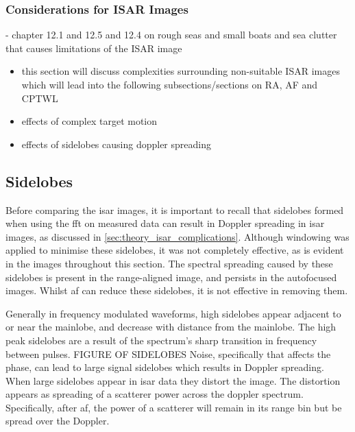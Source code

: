 \documentclass[class=report,11pt,crop=false]{standalone}
\begin{document}
    \subsubsection{Considerations for ISAR Images}
    - chapter 12.1 and 12.5 and 12.4 on rough seas and small boats and sea clutter that causes limitations of the ISAR image
    \begin{itemize}
        \item this section will discuss complexities surrounding non-suitable ISAR images which will lead into the following subsections/sections on RA, AF and CPTWL
        \item effects of complex target motion
        \item effects of sidelobes causing doppler spreading
    \end{itemize}

    \subsection{Sidelobes}
     Before comparing the \gls{isar} images, it is important to recall that sidelobes formed when using the \gls{fft} on measured data can result in Doppler spreading in \gls{isar} images, as discussed in \autoref{sec:theory_isar_complications}.  Although windowing was applied to minimise these sidelobes, it was not completely effective, as is evident in the images throughout this section. The spectral spreading caused by these sidelobes is present in the range-aligned image, and persists in the autofocused images. Whilst \gls{af} can reduce these sidelobes, it is not effective in removing them. 
     
    Generally in frequency modulated waveforms, high sidelobes appear adjacent to or near the mainlobe, and decrease with distance from the mainlobe. The high peak sidelobes are a result of the spectrum’s sharp transition in frequency between pulses.
    FIGURE OF SIDELOBES
    Noise, specifically that affects the phase, can lead to large signal sidelobes which results in Doppler spreading. 
    When large sidelobes appear in \gls{isar} data they distort the image. The distortion appears as spreading of a scatterer power across the doppler spectrum. Specifically, after \gls{af}, the power of a scatterer will remain in its range bin but be spread over the Doppler. 
\end{document}
